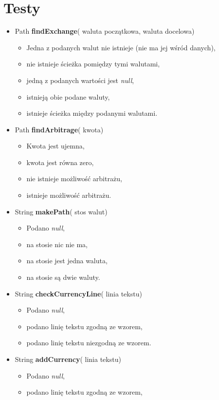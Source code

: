 \documentclass[a4paper,11pt]{article}
\begin{document}
\section{Testy}
\begin{itemize}
\item Path \textbf{findExchange}( waluta początkowa, waluta docelowa)
\begin{itemize}
\item Jedna z podanych walut nie istnieje (nie ma jej wśród danych),
\item nie istnieje ścieżka pomiędzy tymi walutami,
\item jedną z podanych wartości jest \textit{null},
\item istnieją obie podane waluty,
\item istnieje ścieżka między podanymi walutami.
\end{itemize}
\item Path \textbf{findArbitrage}( kwota)
\begin{itemize}
\item Kwota jest ujemna,
\item kwota jest równa zero,
\item nie istnieje możliwość arbitrażu,
\item istnieje możliwość arbitrażu.
\end{itemize}
\item String \textbf{makePath}( stos walut)
\begin{itemize}
\item Podano \textit{null},
\item na stosie nic nie ma,
\item na stosie jest jedna waluta,
\item na stosie są dwie waluty.
\end{itemize}
\item String \textbf{checkCurrencyLine}( linia tekstu)
\begin{itemize}
\item Podano \textit{null},
\item podano linię tekstu zgodną ze wzorem,
\item podano linię tekstu niezgodną ze wzorem.
\end{itemize}
\item String \textbf{addCurrency}( linia tekstu)
\begin{itemize}
\item Podano \textit{null},
\item podano linię tekstu zgodną ze wzorem,

\end{itemize}
\end{itemize}
\end{document}
